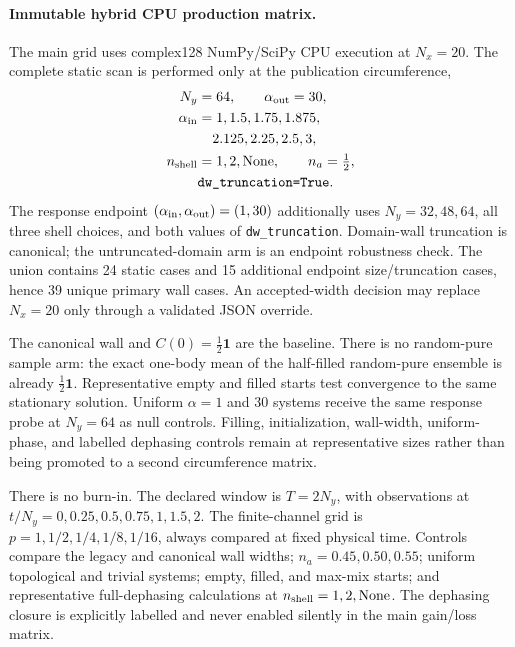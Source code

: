 \documentclass[aps,prx,twocolumn,floatfix,nofootinbib,superscriptaddress,longbibliography]{revtex4-2}
\newcommand{\code}[1]{\texttt{#1}}
\begin{document}
\paragraph*{Immutable hybrid CPU production matrix.}
The main grid uses complex128 NumPy/SciPy CPU execution at $N_x=20$.  The complete static
scan is performed only at the publication circumference,
\begin{equation}
 \begin{split}
 N_y&=64,\qquad \alpha_{\rm out}=30,\\
 \alpha_{\rm in}&=1,1.5,1.75,1.875,\\
                 &\phantom{{}=}2.125,2.25,2.5,3,\\
 n_{\rm shell}&=1,2,\mathrm{None},\qquad n_a=\tfrac12,\\
 &\code{dw\_truncation=True} .
 \end{split}
 \label{eq:M1-cpu-grid}
\end{equation}
The response endpoint $(\alpha_{\rm in},\alpha_{\rm out})=(1,30)$ additionally uses
$N_y=32,48,64$, all three shell choices, and both values of
\code{dw\_truncation}.  Domain-wall truncation is canonical; the untruncated-domain arm
is an endpoint robustness check.  The union contains 24 static cases and 15 additional
endpoint size/truncation cases, hence 39 unique primary wall cases.  An accepted-width
decision may replace $N_x=20$ only through a validated JSON override.

The canonical wall and $C(0)=\frac12\mathbf{1}$ are the baseline.  There is no random-pure
sample arm: the exact one-body mean of the half-filled random-pure ensemble is already
$\frac12\mathbf{1}$.  Representative empty and filled starts test convergence to the same
stationary solution.  Uniform $\alpha=1$ and $30$ systems receive the same response probe
at $N_y=64$ as null controls.  Filling, initialization, wall-width, uniform-phase, and
labelled dephasing controls remain at representative sizes rather than being promoted to a
second circumference matrix.

There is no burn-in.  The declared window is $T=2N_y$, with observations at
$t/N_y=0,0.25,0.5,0.75,1,1.5,2$.  The finite-channel grid is
$p=1,1/2,1/4,1/8,1/16$, always compared at fixed physical time.  Controls compare the
legacy and canonical wall widths; $n_a=0.45,0.50,0.55$; uniform topological and trivial
systems; empty, filled, and max-mix starts; and representative full-dephasing calculations
at $n_{\rm shell}=1,2,\mathrm{None}$.  The dephasing closure is explicitly labelled and
never enabled silently in the main gain/loss matrix.
\end{document}
